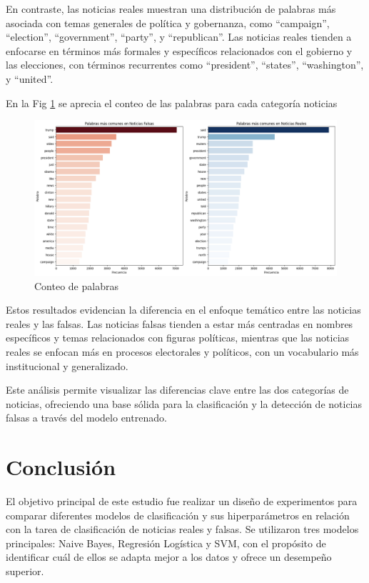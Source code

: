\documentclass[journal]{IEEEtran}
\begin{document}
En contraste, las noticias reales muestran una distribución de palabras más asociada con temas generales de política y gobernanza, como “campaign”, “election”, “government”, “party”, y “republican”. Las noticias reales tienden a enfocarse en términos más formales y específicos relacionados con el gobierno y las elecciones, con términos recurrentes como “president”, “states”, “washington”, y “united”.

En la Fig \ref{fig:count} se aprecia el conteo de las palabras para cada categoría noticias

\begin{figure}
    \centering
    \includegraphics[width=0.8\linewidth]{Figs/word_count.png}
    \caption{Conteo de palabras}
    \label{fig:count}
\end{figure}

Estos resultados evidencian la diferencia en el enfoque temático entre las noticias reales y las falsas. Las noticias falsas tienden a estar más centradas en nombres específicos y temas relacionados con figuras políticas, mientras que las noticias reales se enfocan más en procesos electorales y políticos, con un vocabulario más institucional y generalizado.

Este análisis permite visualizar las diferencias clave entre las dos categorías de noticias, ofreciendo una base sólida para la clasificación y la detección de noticias falsas a través del modelo entrenado.

\section{Conclusión}
El objetivo principal de este estudio fue realizar un diseño de experimentos para comparar diferentes modelos de clasificación y sus hiperparámetros en relación con la tarea de clasificación de noticias reales y falsas. Se utilizaron tres modelos principales: Naive Bayes, Regresión Logística y SVM, con el propósito de identificar cuál de ellos se adapta mejor a los datos y ofrece un desempeño superior.
\end{document}
